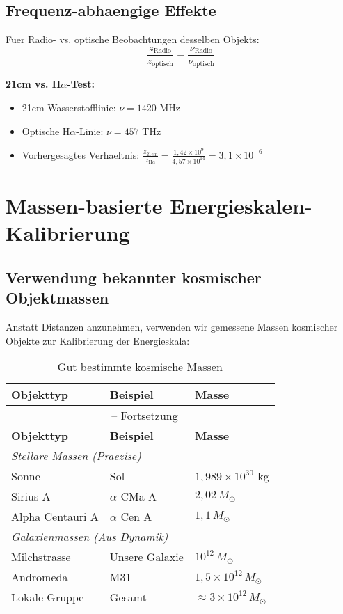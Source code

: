 \documentclass[12pt,a4paper]{article}
\theoremstyle{definition}
\begin{document}
	\subsection{Frequenz-abhaengige Effekte}
	
	Fuer Radio- vs. optische Beobachtungen desselben Objekts:
	\begin{equation}
		\frac{z_{\text{Radio}}}{z_{\text{optisch}}} = \frac{\nu_{\text{Radio}}}{\nu_{\text{optisch}}}
	\end{equation}
	
	\begin{experiment}
		\textbf{21cm vs. H$\alpha$-Test:}
		\begin{itemize}
			\item 21cm Wasserstofflinie: $\nu = 1420$ MHz
			\item Optische H$\alpha$-Linie: $\nu = 457$ THz
			\item Vorhergesagtes Verhaeltnis: $\frac{z_{21\text{cm}}}{z_{\text{H}\alpha}} = \frac{1,42 \times 10^9}{4,57 \times 10^{14}} = 3,1 \times 10^{-6}$
		\end{itemize}
	\end{experiment}
	
	\section{Massen-basierte Energieskalen-Kalibrierung}
	
	\subsection{Verwendung bekannter kosmischer Objektmassen}
	
	Anstatt Distanzen anzunehmen, verwenden wir gemessene Massen kosmischer Objekte zur Kalibrierung der Energieskala:
	
	\begin{longtable}{lll}
		\caption{Gut bestimmte kosmische Massen} \\
		\toprule
		\textbf{Objekttyp} & \textbf{Beispiel} & \textbf{Masse} \\
		\midrule
		\endfirsthead
		\multicolumn{3}{c}{\tablename\ \thetable{} -- Fortsetzung} \\
		\toprule
		\textbf{Objekttyp} & \textbf{Beispiel} & \textbf{Masse} \\
		\midrule
		\endhead
		\multicolumn{3}{l}{\emph{Stellare Massen (Praezise)}} \\
		Sonne & Sol & $1,989 \times 10^{30}$ kg \\
		Sirius A & $\alpha$ CMa A & $2,02\,M_\odot$ \\
		Alpha Centauri A & $\alpha$ Cen A & $1,1\,M_\odot$ \\
		\midrule
		\multicolumn{3}{l}{\emph{Galaxienmassen (Aus Dynamik)}} \\
		Milchstrasse & Unsere Galaxie & $10^{12}\,M_\odot$ \\
		Andromeda & M31 & $1,5 \times 10^{12}\,M_\odot$ \\
		Lokale Gruppe & Gesamt & $\approx 3 \times 10^{12}\,M_\odot$ \\
		\bottomrule
	\end{longtable}
	
\end{document}
